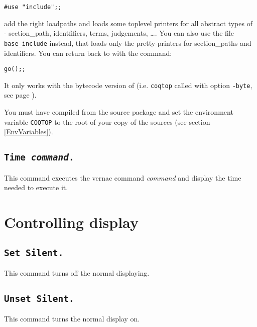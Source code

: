\begin{flushleft}
\begin{verbatim}
#use "include";;
\end{verbatim}
\end{flushleft}

\noindent add the right loadpaths and loads some toplevel printers for
all abstract types of \Coq - section\_path, identfifiers, terms, judgements,
\dots. You can also use the file \texttt{base\_include} instead,
that loads only the pretty-printers for section\_paths and
identifiers.
You can return back to \Coq{} with the command: 

\begin{flushleft}
\begin{verbatim}
go();;
\end{verbatim}
\end{flushleft}

\begin{Warnings}
\item It only works with the bytecode version of {\Coq} (i.e. {\tt coqtop} called with option {\tt -byte}, see page \pageref{binary-images}).
\item You must have compiled {\Coq} from the source package and set the
  environment variable \texttt{COQTOP} to the root of your copy of the sources (see section \ref{EnvVariables}).
\end{Warnings}

\subsection{\tt Time \textrm{\textsl{command}}.}
\label{time}
This command executes the vernac command \textrm{\textsl{command}}
and display the time needed to execute it.

\section{Controlling display}

\subsection{\tt Set Silent.}
\label{Begin-Silent}
This command turns off the normal displaying.

\subsection{\tt Unset Silent.}
This command turns the normal display on.

